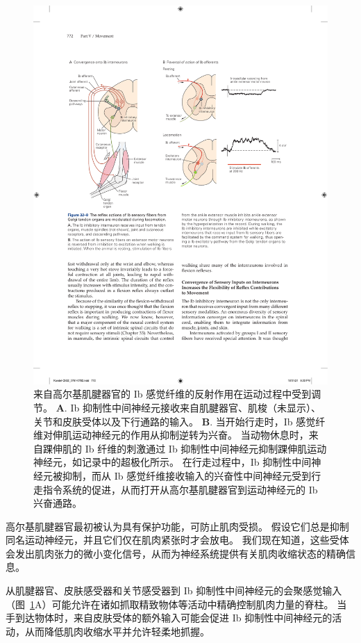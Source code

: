 \begin{figure}[htbp]
	\centering
	\includegraphics[width=0.9\linewidth]{chap32/fig_32_8}
	\caption{来自高尔基肌腱器官的 Ib 感觉纤维的反射作用在运动过程中受到调节。
	\textbf{A}. Ib 抑制性中间神经元接收来自肌腱器官、肌梭（未显示）、关节和皮肤受体以及下行通路的输入。
	\textbf{B}. 当开始行走时，Ib 感觉纤维对伸肌运动神经元的作用从抑制逆转为兴奋。 当动物休息时，来自踝伸肌的 Ib 纤维的刺激通过 Ib 抑制性中间神经元抑制踝伸肌运动神经元，如记录中的超极化所示。
	在行走过程中，Ib 抑制性中间神经元被抑制，而从 Ib 感觉纤维接收输入的兴奋性中间神经元受到行走指令系统的促进，从而打开从高尔基肌腱器官到运动神经元的 Ib 兴奋通路。}
	\label{fig:32_8}
\end{figure}


高尔基肌腱器官最初被认为具有保护功能，可防止肌肉受损。
假设它们总是抑制同名运动神经元，并且它们仅在肌肉紧张时才会放电。
我们现在知道，这些受体会发出肌肉张力的微小变化信号，从而为神经系统提供有关肌肉收缩状态的精确信息。


从肌腱器官、皮肤感受器和关节感受器到 Ib 抑制性中间神经元的会聚感觉输入（图~\ref{fig:32_8}A）可能允许在诸如抓取精致物体等活动中精确控制肌肉力量的脊柱。
当手到达物体时，来自皮肤受体的额外输入可能会促进 Ib 抑制性中间神经元的活动，从而降低肌肉收缩水平并允许轻柔地抓握。



